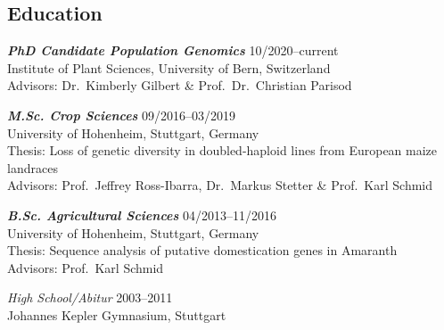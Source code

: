 \documentclass[margin]{res}
\begin{document}
\begin{resume}

\section{Education}

\textbf{\textit{PhD Candidate Population Genomics}} \hfill 10/2020--current \\
Institute of Plant Sciences, University of Bern, Switzerland \\
Advisors: Dr.~Kimberly Gilbert \& Prof.~Dr.~Christian Parisod


\textbf{\textit{M.Sc. Crop Sciences}} \hfill 09/2016--03/2019 \\
University of Hohenheim, Stuttgart, Germany \\
Thesis: Loss of genetic diversity in doubled-haploid lines from European maize landraces \\
Advisors: Prof.~Jeffrey Ross-Ibarra, Dr.~Markus Stetter \& Prof.~Karl Schmid


\textbf{\textit{B.Sc. Agricultural Sciences}} \hfill 04/2013--11/2016 \\
University of Hohenheim, Stuttgart, Germany\\
Thesis: Sequence analysis of putative domestication genes in Amaranth\\
Advisors: Prof.~Karl Schmid

{\sl High School/Abitur} \hfill 2003--2011 \\
Johannes Kepler Gymnasium, Stuttgart

 

\end{resume}
\end{document}

